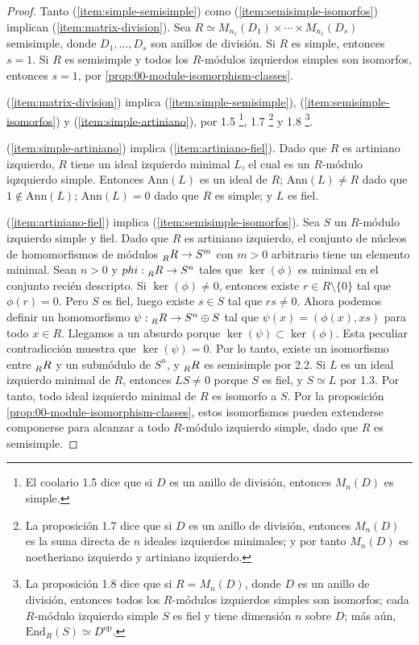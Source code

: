 \documentclass{article}
\newcommand{\End}{\text{End}}
\newcommand{\RAsRModule}{\prescript{}{R}{R}}
\begin{document}
\begin{proof}
    Tanto (\ref{item:simple-semisimple}) como (\ref{item:semisimple-isomorfos}) implican (\ref{item:matrix-division}).
    Sea $R \simeq M_{n_1}(D_1) \times \cdots \times M_{n_s}(D_s)$ semisimple, donde $D_1, \dots, D_s$ son anillos de división.
    Si $R$ es simple, entonces $s = 1$. Si $R$ es semisimple y todos los $R$-módulos izquierdos simples son isomorfos, entonces $s = 1$, por \ref{prop:00-module-isomorphism-classes}.

    (\ref{item:matrix-division}) implica (\ref{item:simple-semisimple}), (\ref{item:semisimple-isomorfos}) y (\ref{item:simple-artiniano}), por 1.5
    \footnote{
        El coolario 1.5 dice que si $D$ es un anillo de división, entonces $M_n(D)$ es simple.
    }, 1.7
    \footnote{
        La proposición 1.7 dice que si $D$ es un anillo de división, entonces $M_n(D)$ es la suma directa de $n$ ideales izquierdos minimales; y por tanto $M_n(D)$ es noetheriano izquierdo y artiniano izquierdo.
    } y 1.8
    \footnote{
        La proposición 1.8 dice que si $R = M_n(D)$, donde $D$ es un anillo de división, entonces todos los $R$-módulos izquierdos simples son isomorfos; cada $R$-módulo izquierdo simple $S$ es fiel y tiene dimensión $n$ sobre $D$; más aún, $\End_R(S) \simeq D^{\text{op}}$.
    }.

    (\ref{item:simple-artiniano}) implica (\ref{item:artiniano-fiel}).
    Dado que $R$ es artiniano izquierdo, $R$ tiene un ideal izquierdo minimal $L$, el cual es un $R$-módulo iqzquierdo simple.
    Entonces $\text{Ann}(L)$ es un ideal de $R$; $\text{Ann}(L) \neq R$ dado que $1 \notin \text{Ann}(L)$; $\text{Ann}(L) = 0$ dado que $R$ es simple; y $L$ es fiel.

    (\ref{item:artiniano-fiel}) implica (\ref{item:semisimple-isomorfos}).
    Sea $S$ un $R$-módulo izquierdo simple y fiel.
    Dado que $R$ es artiniano izquierdo, el conjunto de núcleos de homomorfismos de módulos $\RAsRModule \rightarrow S^m$ con $m > 0$ arbitrario tiene un elemento minimal.
    Sean $n > 0$ y $phi: \RAsRModule \rightarrow S^n$ tales que $\ker(\phi)$ es minimal en el conjunto recién descripto.
    Si $\ker(\phi) \neq 0$, entonces existe $r \in R \setminus \{0\}$ tal que $\phi(r) = 0$.
    Pero $S$ es fiel, luego existe $s\in S$ tal que $r s \neq 0$.
    Ahora podemos definir un homomorfismo $\psi: \RAsRModule \rightarrow S^n \oplus S$ tal que $\psi(x) = (\phi(x), x s)$ para todo $x \in R$.
    Llegamos a un absurdo porque $\ker(\psi) \subset \ker(\phi)$.
    Esta peculiar contradicción muestra que $\ker(\psi) = 0$.
    Por lo tanto, existe un isomorfismo entre $\RAsRModule$ y un submódulo de $S^n$, y $\RAsRModule$ es semisimple por 2.2.
    Si $L$ es un ideal izquierdo minimal de $R$, entonces $LS \neq 0$ porque $S$ es fiel, y $S \simeq L$ por 1.3.
    Por tanto, todo ideal izquierdo minimal de $R$ es isomorfo a $S$.
    Por la proposición \ref{prop:00-module-isomorphism-classes}, estos isomorfismos pueden extenderse componerse para alcanzar a todo $R$-módulo izquierdo simple, dado que $R$ es semisimple.
\end{proof}
\end{document}

